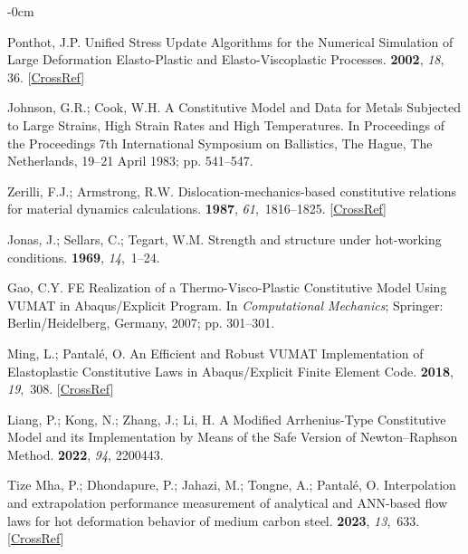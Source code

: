 \documentclass[algorithms,article,accept,pdftex,oneauthor]{Definitions/mdpi}
\begin{document}
\begin{adjustwidth}{-\extralength}{0cm}
\begin{thebibliography}{999}
Ponthot, J.P.
\newblock Unified Stress Update Algorithms for the Numerical Simulation of
Large Deformation Elasto-Plastic and Elasto-Viscoplastic Processes.
 {\bf 2002}, \emph{18}, 
36. [\href{http://dx.doi.org/10.1016/S0749-6419(00)00097-8}{CrossRef}]

Johnson, G.R.; Cook, W.H.
\newblock A  Constitutive Model  and  Data  for  Metals Subjected  to
 Large Strains,  High Strain Rates and  High Temperatures.
\newblock In Proceedings of the Proceedings 7th  International Symposium  on
 Ballistics,  The Hague, The Netherlands, 19--21 April 1983; pp. 541--547.

Zerilli, F.J.; Armstrong, R.W.
\newblock Dislocation-mechanics-based constitutive relations for material
dynamics calculations.
 {\bf 1987}, {\em 61},~1816--1825. [\href{http://dx.doi.org/10.1063/1.338024}{CrossRef}]

Jonas, J.; Sellars, C.; Tegart, W.M.
\newblock Strength and structure under hot-working conditions.
 {\bf 1969}, {\em 14},~1--24.

Gao, C.Y.
\newblock  FE  Realization of a Thermo-Visco-Plastic Constitutive Model Using
VUMAT in Abaqus/Explicit Program.
\newblock In \emph{Computational Mechanics}; {Springer}: {Berlin/Heidelberg}, Germany, 
2007; pp. 301--301.

Ming, L.; Pantal{\'e}, O.
\newblock An Efficient and Robust {{VUMAT}} Implementation of Elastoplastic
Constitutive Laws in {{Abaqus}}/{{Explicit}} Finite Element Code.
 {\bf 2018}, {\em 19},~308. [\href{http://dx.doi.org/10.1051/meca/2018021}{CrossRef}]

Liang, P.; Kong, N.; Zhang, J.; Li, H.
\newblock A Modified Arrhenius-Type Constitutive Model and its Implementation
by Means of the Safe Version of Newton–Raphson Method.
 {\bf 2022}, \emph{94}, 2200443.

{Tize Mha}, P.; Dhondapure, P.; Jahazi, M.; Tongne, A.; Pantal{\'e}, O.
\newblock Interpolation and extrapolation performance measurement of analytical
and ANN-based flow laws for hot deformation behavior of medium carbon steel.
 {\bf 2023}, {\em 13},~633. [\href{http://dx.doi.org/10.3390/met13030633}{CrossRef}]


\end{thebibliography}
\end{adjustwidth}
\end{document}
